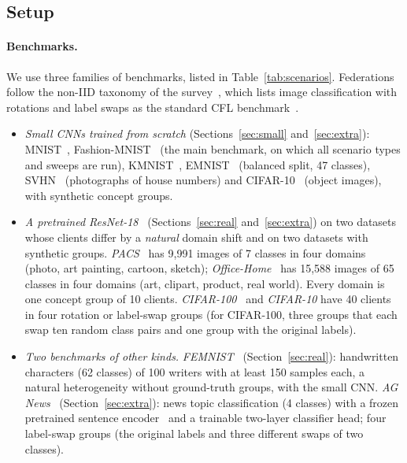 \subsection{Setup}\label{sec:setup}
\paragraph{Benchmarks.} We use three families of benchmarks, listed in Table~\ref{tab:scenarios}. Federations follow the non-IID taxonomy of the survey~\citep{benali2026survey}, which lists image classification with rotations and label swaps as the standard CFL benchmark~\citep[Table~6]{benali2026survey}.
\begin{itemize}[leftmargin=*,itemsep=1pt]
\item \emph{Small CNNs trained from scratch} (Sections~\ref{sec:small} and~\ref{sec:extra}): MNIST~\citep{lecun1998mnist}, Fashion-MNIST~\citep{xiao2017fmnist} (the main benchmark, on which all scenario types and sweeps are run), KMNIST~\citep{clanuwat2018kmnist}, EMNIST~\citep{cohen2017emnist} (balanced split, 47 classes), SVHN~\citep{netzer2011svhn} (photographs of house numbers) and CIFAR-10~\citep{krizhevsky2009cifar} (object images), with synthetic concept groups.
\item \emph{A pretrained ResNet-18}~\citep{he2016resnet} (Sections~\ref{sec:real} and~\ref{sec:extra}) on two datasets whose clients differ by a \emph{natural} domain shift and on two datasets with synthetic groups. \emph{PACS}~\citep{li2017pacs} has 9{,}991 images of 7 classes in four domains (photo, art painting, cartoon, sketch); \emph{Office-Home}~\citep{venkateswara2017officehome} has 15{,}588 images of 65 classes in four domains (art, clipart, product, real world). Every domain is one concept group of 10 clients. \emph{CIFAR-100}~\citep{krizhevsky2009cifar} and \emph{CIFAR-10} have 40 clients in four rotation or label-swap groups (for CIFAR-100, three groups that each swap ten random class pairs and one group with the original labels).
\item \emph{Two benchmarks of other kinds.} \emph{FEMNIST}~\citep{caldas2018leaf} (Section~\ref{sec:real}): handwritten characters (62 classes) of 100 writers with at least 150 samples each, a natural heterogeneity without ground-truth groups, with the small CNN. \emph{AG News}~\citep{zhang2015charcnn} (Section~\ref{sec:extra}): news topic classification (4 classes) with a frozen pretrained sentence encoder~\citep{reimers2019sbert} and a trainable two-layer classifier head; four label-swap groups (the original labels and three different swaps of two classes).
\end{itemize}

